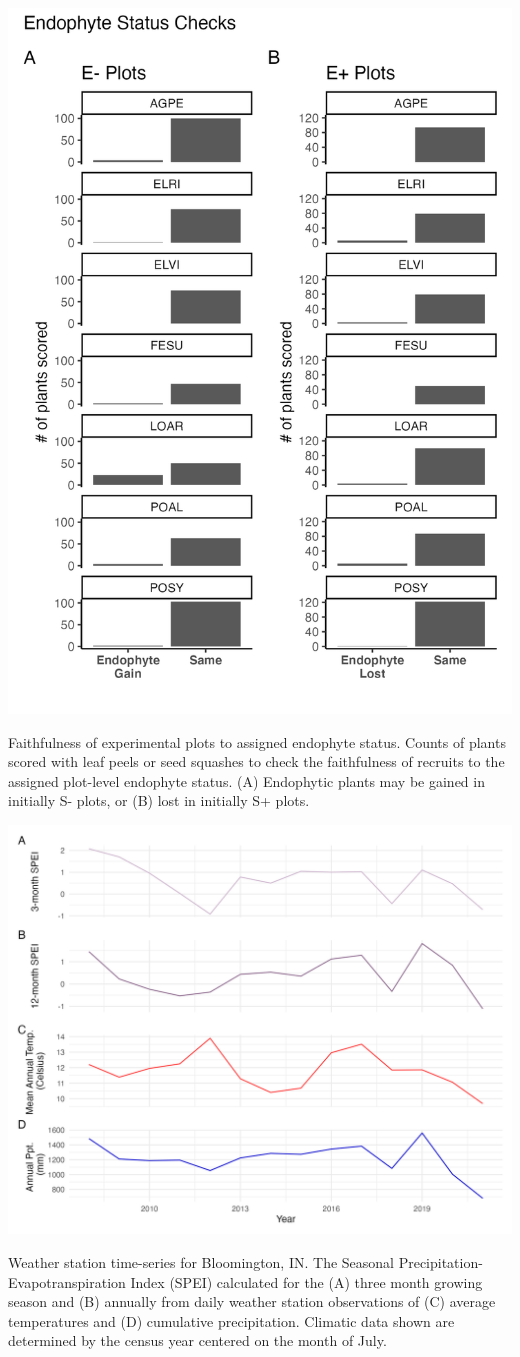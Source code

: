 \documentclass[lineno, sn-basic]{sn-jnl}%
\providecommand{\DIFadd}[1]{{\protect\color{blue}#1}} %
\providecommand{\DIFadd}[1]{{\protect\color{blue}\uwave{#1}}} %
\providecommand{\DIFaddbegin}{} %
\newcommand{\DIFaddincludegraphics}[2][]{{\color{blue}\fbox{\DIFOincludegraphics[#1]{#2}}}} %
\DeclareRobustCommand{\DIFaddbegin}{\DIFOaddbegin \let\includegraphics\DIFaddincludegraphics} %
\begin{document}
\DIFaddbegin \begin{myfigure}[H]
	\centering
	\includegraphics[width=.6\linewidth]{endo_check_plot.png}
	\caption[Faithfulness of experimental plots to assigned endophyte status]{\DIFadd{Faithfulness of experimental plots to assigned endophyte status. Counts of plants scored with leaf peels or seed squashes to check the faithfulness of recruits to the assigned plot-level endophyte status. (A) Endophytic plants may be gained in initially S- plots, or (B) lost in initially S+ plots.}}
\end{myfigure}



\begin{myfigure}[H]
	\centering
	\includegraphics[width=\linewidth]{climate_plot.png}
	\caption[Weather station time-series for Bloomington, IN]{\DIFadd{Weather station time-series for Bloomington, IN. The Seasonal Precipitation-Evapotranspiration Index (SPEI) calculated for the (A) three month growing season and (B) annually from daily weather station observations of (C) average temperatures and (D) cumulative precipitation. Climatic data shown are determined by the census year centered on the month of July.}}
\end{myfigure}
\end{document}
